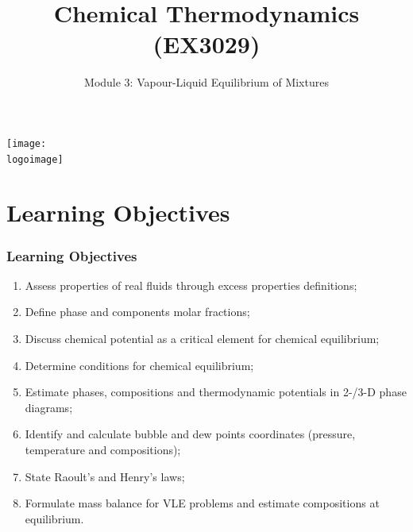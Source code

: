 \documentclass[10pt,compress,unknownkeysallowed]{beamer}
\institute{School of Engineering}
\title{Chemical Thermodynamics (EX3029)}
\subtitle{Module 3: Vapour-Liquid Equilibrium of Mixtures}
\date[ ]{ }
\newcommand{\logoimage}{../../FigBanner/UoAHorizBanner}
\begin{document}
\begin{frame}
  \titlepage
  \vfill%
  \begin{center}
    \texttt{[image: \\logoimage]}
  \end{center}
\end{frame}





\section{Learning Objectives}

\begin{frame}
 \frametitle{Learning Objectives}
   \begin{enumerate}
     \item<1-> Assess properties of real fluids through excess properties definitions; 
     \item<1-> Define phase and components molar fractions;
     \item<1-> Discuss chemical potential as a critical element for chemical equilibrium;
     \item<1-> Determine conditions for chemical equilibrium;
     \item<1-> Estimate phases, compositions and thermodynamic potentials in 2-/3-D phase diagrams;
     \item<1-> Identify and calculate bubble and dew points coordinates (\ie pressure, temperature and compositions);
     \item<1-> State Raoult's and Henry's laws;
     \item<1-> Formulate mass balance for VLE problems and estimate compositions at equilibrium.
   \end{enumerate}

\end{frame}

\end{document}
